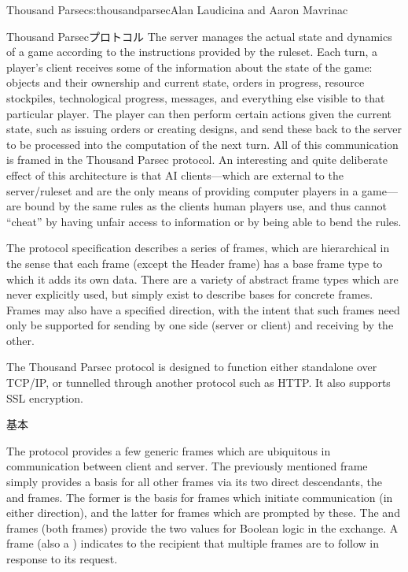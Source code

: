 \begin{aosachapter}{Thousand Parsec}{s:thousandparsec}{Alan Laudicina and Aaron Mavrinac}
\begin{aosasect1}{Thousand Parsecプロトコル}
The server manages the actual state and dynamics of a game according
to the instructions provided by the ruleset. Each turn, a player's
client receives some of the information about the state of the game:
objects and their ownership and current state, orders in progress,
resource stockpiles, technological progress, messages, and everything
else visible to that particular player. The player can then perform
certain actions given the current state, such as issuing orders or
creating designs, and send these back to the server to be processed
into the computation of the next turn. All of this communication is
framed in the Thousand Parsec protocol. An interesting and quite
deliberate effect of this architecture is that AI clients---which are
external to the server/ruleset and are the only means of providing
computer players in a game---are bound by the same rules as the
clients human players use, and thus cannot ``cheat'' by having unfair
access to information or by being able to bend the rules.

The protocol specification describes a series of frames, which are
hierarchical in the sense that each frame (except the Header frame)
has a base frame type to which it adds its own data. There are a
variety of abstract frame types which are never explicitly used, but
simply exist to describe bases for concrete frames. Frames may also
have a specified direction, with the intent that such frames need only
be supported for sending by one side (server or client) and receiving
by the other.

The Thousand Parsec protocol is designed to function either standalone
over TCP/IP, or tunnelled through another protocol such as HTTP.  It
also supports SSL encryption.

\begin{aosasect2}{基本}

The protocol provides a few generic frames which are ubiquitous in
communication between client and server. The previously mentioned
 frame simply provides a basis for all other frames via
its two direct descendants, the  and 
frames. The former is the basis for frames which initiate
communication (in either direction), and the latter for frames which
are prompted by these. The  and  frames (both
 frames) provide the two values for Boolean logic in
the exchange. A  frame (also a )
indicates to the recipient that multiple frames are to follow in
response to its request.


\end{aosasect2}
\end{aosasect1}
\end{aosachapter}
